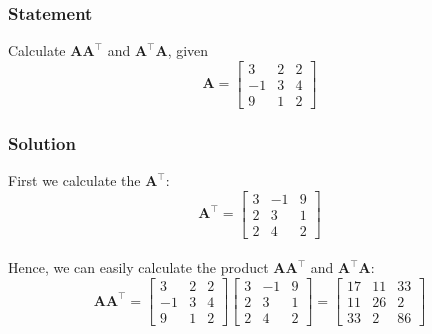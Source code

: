 \documentclass{article}
\begin{document}
            \subsubsection{Statement}
                Calculate $\mathbf{AA}^\intercal$ and $\mathbf{{A}^\intercal A}$, given
                \begin{equation*}
                    \mathbf{A} = \begin{bmatrix}3 & 2 & 2 \\ -1 & 3 & 4 \\ 9 & 1 & 2\end{bmatrix}
                \end{equation*}

            \subsubsection{Solution}
                First we calculate the $\mathbf{A}^\intercal$:
                \begin{equation*}
                    \mathbf{A}^\intercal = \begin{bmatrix}3 & -1 & 9 \\ 2 & 3 & 1 \\ 2 & 4 & 2\end{bmatrix}
                \end{equation*}
                \\
                Hence, we can easily calculate the product $\mathbf{AA}^\intercal$ and $\mathbf{{A}^\intercal A}$:
                \begin{equation*}
                    \mathbf{AA}^\intercal =
                    \begin{bmatrix}3 & 2 & 2 \\ -1 & 3 & 4 \\ 9 & 1 & 2\end{bmatrix}
                    \begin{bmatrix}3 & -1 & 9 \\ 2 & 3 & 1 \\ 2 & 4 & 2\end{bmatrix}
                    =
                    \begin{bmatrix}17 & 11 & 33 \\ 11 & 26 & 2 \\ 33 & 2 & 86\end{bmatrix}
                \end{equation*}
\end{document}
